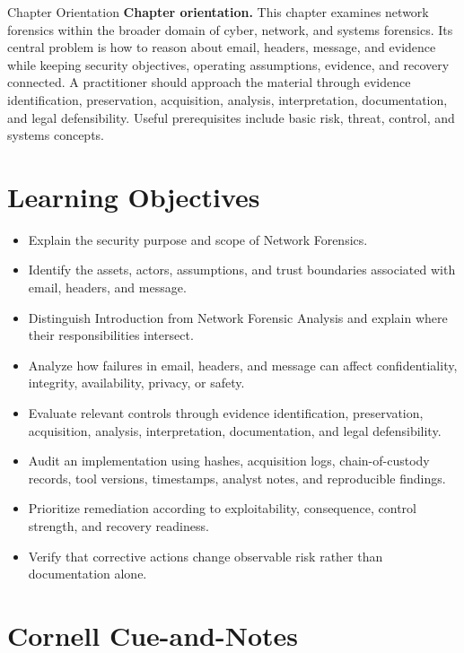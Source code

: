 \documentclass[11pt,letterpaper]{article}
\title{\CornellDocumentTitle}
\author{}
\date{}
\begin{document}
\maketitle
\begin{CornellOverviewBox}{Chapter Orientation}
\textbf{Chapter orientation.} This chapter examines network forensics within the broader domain of cyber, network, and systems forensics. Its central problem is how to reason about email, headers, message, and evidence while keeping security objectives, operating assumptions, evidence, and recovery connected. A practitioner should approach the material through evidence identification, preservation, acquisition, analysis, interpretation, documentation, and legal defensibility. Useful prerequisites include basic risk, threat, control, and systems concepts.
\end{CornellOverviewBox}
\section*{Learning Objectives}
\begin{itemize}
\item Explain the security purpose and scope of Network Forensics.
\item Identify the assets, actors, assumptions, and trust boundaries associated with email, headers, and message.
\item Distinguish Introduction from Network Forensic Analysis and explain where their responsibilities intersect.
\item Analyze how failures in email, headers, and message can affect confidentiality, integrity, availability, privacy, or safety.
\item Evaluate relevant controls through evidence identification, preservation, acquisition, analysis, interpretation, documentation, and legal defensibility.
\item Audit an implementation using hashes, acquisition logs, chain-of-custody records, tool versions, timestamps, analyst notes, and reproducible findings.
\item Prioritize remediation according to exploitability, consequence, control strength, and recovery readiness.
\item Verify that corrective actions change observable risk rather than documentation alone.
\end{itemize}
\section*{Cornell Cue-and-Notes}
\end{document}
